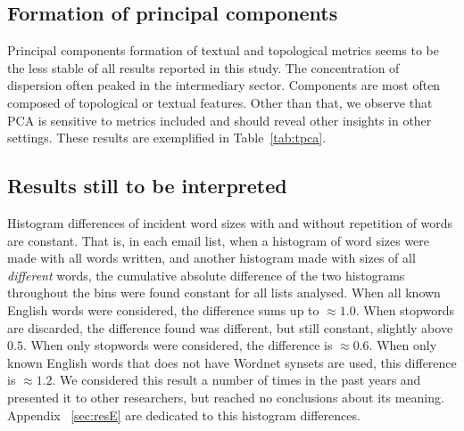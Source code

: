 \subsection{Formation of principal components}\label{subsec:pc}

% 
Principal components formation of textual and topological metrics
seems to be the less stable of all results reported in this study.
The concentration of dispersion often peaked in the intermediary sector.
Components are most often composed of topological or textual features.
Other than that, we observe that PCA is sensitive to metrics included
and should reveal other insights in other settings.
These results are exemplified in Table~\ref{tab:tpca}.

\subsection{Results still to be interpreted}\label{subsec:sii}
Histogram differences of incident word sizes with and without repetition of words are constant.
That is, in each email list, when a histogram of word sizes were made with all words written,
and another histogram made with sizes of all \emph{different} words,
the cumulative absolute difference of the two histograms throughout the bins were found constant for all lists analysed.
When all known English words were considered, 
the difference sums up to $\approx 1.0$.
When stopwords are discarded,
the difference found was different, but still constant, slightly above $0.5$.
When only stopwords were considered, the difference is $\approx 0.6$.
When only known English words that does not have Wordnet synsets are used,
this difference is $\approx 1.2$.
We considered this result a number of times in the past years and presented it to other researchers,
but reached no conclusions about its meaning.
Appendix ~\ref{sec:resE} are dedicated to this histogram differences.

